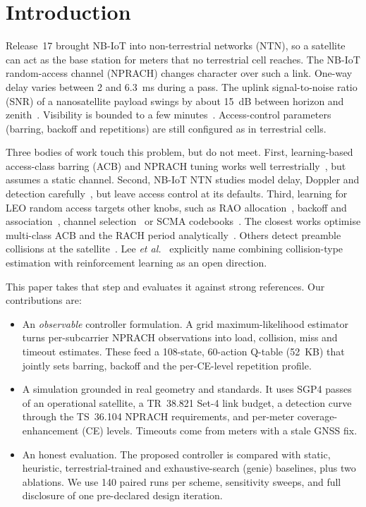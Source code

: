\documentclass[conference]{IEEEtran}
\begin{document}
\section{Introduction}
Release~17 brought NB-IoT into non-terrestrial networks (NTN), so a satellite can act as the base station for meters that no terrestrial cell reaches. The NB-IoT random-access channel (NPRACH) changes character over such a link. One-way delay varies between 2 and 6.3~ms during a pass. The uplink signal-to-noise ratio (SNR) of a nanosatellite payload swings by about 15~dB between horizon and zenith~\cite{dwivedi2024efficient}. Visibility is bounded to a few minutes~\cite{dwivedi2024efficient,le2024survey}. Access-control parameters (barring, backoff and repetitions) are still configured as in terrestrial cells.

Three bodies of work touch this problem, but do not meet. First, learning-based access-class barring (ACB) and NPRACH tuning works well terrestrially~\cite{tello2018acb,bui2020drlacb,abera2025ddqn,jiang2019rl,daraseliya2026reactive}, but assumes a static channel. Second, NB-IoT NTN studies model delay, Doppler and detection carefully~\cite{chougrani2022nbiot,lin2025unified,kodheli2021ra,shen2025leo}, but leave access control at its defaults. Third, learning for LEO random access targets other knobs, such as RAO allocation~\cite{liu2022dyna}, backoff and association~\cite{lee2023erach}, channel selection~\cite{feng2026joint} or SCMA codebooks~\cite{wu2025scma}. The closest works optimise multi-class ACB and the RACH period analytically~\cite{chen2026channel}. Others detect preamble collisions at the satellite~\cite{jeong2025mtecd,jeong2026isc,lee2025dl}. Lee \emph{et al.}~\cite{lee2025dl} explicitly name combining collision-type estimation with reinforcement learning as an open direction.

This paper takes that step and evaluates it against strong references. Our contributions are:
\begin{itemize}
\item An \emph{observable} controller formulation. A grid maximum-likelihood estimator turns per-subcarrier NPRACH observations into load, collision, miss and timeout estimates. These feed a 108-state, 60-action Q-table (52~KB) that jointly sets barring, backoff and the per-CE-level repetition profile.
\item A simulation grounded in real geometry and standards. It uses SGP4 passes of an operational satellite, a TR~38.821 Set-4 link budget, a detection curve through the TS~36.104 NPRACH requirements, and per-meter coverage-enhancement (CE) levels. Timeouts come from meters with a stale GNSS fix.
\item An honest evaluation. The proposed controller is compared with static, heuristic, terrestrial-trained and exhaustive-search (genie) baselines, plus two ablations. We use 140 paired runs per scheme, sensitivity sweeps, and full disclosure of one pre-declared design iteration.
\end{itemize}
\end{document}
